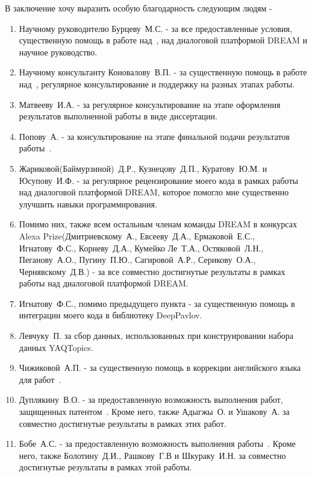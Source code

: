 В заключение хочу выразить особую благодарность следующим людям - 
\begin{enumerate}
\item Научному руководителю Бурцеву~М.\:С. - за все предоставленные условия, существенную помощь в работе над~\cite{dream1,dream1_trudy,dream2,pseudolabel}, над диалоговой платформой DREAM и научное руководство.
\item Научному консультанту Коновалову~В.\:П. - за существенную помощь в работе над~\cite{rumtl,rutopics,dp_2023}, регулярное консультирование и поддержку на разных этапах работы.
\item Матвееву~И.\:А. - за регулярное консультирование на этапе оформления результатов выполненной работы в виде диссертации.
\item Попову~А. - за консультирование на этапе финальной подачи результатов работы~\cite{rutopics}.
\item Жариковой(Баймурзиной)~Д.\:Р., Кузнецову~Д.\:П., Куратову~Ю.\:М. и Юсупову~И.\:Ф. - за регулярное рецензирование моего кода в рамках работы над диалоговой платформой DREAM, которое помогло мне существенно улучшить навыки программирования. 
\item Помимо них, также всем остальным членам команды DREAM в конкурсах Alexa Prize(Дмитриевскому~А., Евсееву~Д.\:А., Ермаковой~Е.\:С., Игнатову~Ф.\:С., Корневу~Д.\:А., Кумейко Ле~Т.\:А., Остяковой~Л.\:Н., Пеганову~А.\:О., Пугину~П.\:Ю., Сагировой~А.\:Р., Серикову~О.\:А., Чернявскому~Д.\:В.) - за все совместно достигнутые результаты в рамках работы над диалоговой платформой DREAM. 
\item Игнатову~Ф.\:С., помимо предыдущего пункта - за существенную помощь в интеграции моего кода в библиотеку DeepPavlov.
\item Левчуку~П. за сбор данных, использованных при конструировании набора данных YAQTopics.
\item Чижиковой~А.\:П. - за существенную помощь в коррекции английского языка для работ~\cite{rumtl,rutopics}.
\item Дуплякину~В.\:О. - за предоставленную возможность выполнения работ, защищенных патентом~\cite{Дуплякин_Дмитрий_Ондар_Ушаков_2021}. Кроме него, также Адыгжы~\:О. и Ушакову~\:А. за совместно достигнутые результаты в рамках этих работ. 
\item Бобе~А.\:С. - за предоставленную возможность выполнения работы~\cite{Болотин_Карпов_Рашков_Шкурак_2019}. Кроме него, также Болотину~Д.\:И., Рашкову~Г.\:В и Шкураку~И.\:Н. за совместно достигнутые результаты в рамках этой работы. 

\end{enumerate}
